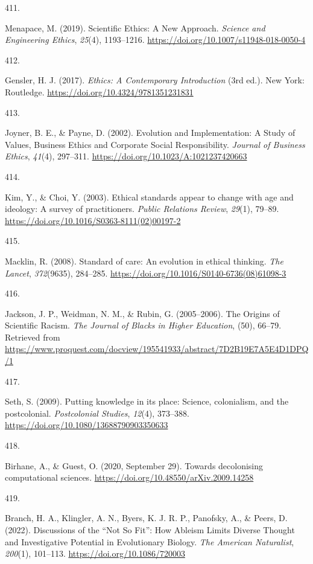 \documentclass[
  11pt,
  letterpaper,
]{scrreprt}
\newlength{\cslhangindent}
\newlength{\csllabelwidth}
\newenvironment{CSLReferences}[2] %
 {\begin{list}{}{%
  \setlength{\itemindent}{0pt}
  \setlength{\leftmargin}{0pt}
  \setlength{\parsep}{0pt}
  \ifodd #1
   \setlength{\leftmargin}{\cslhangindent}
   \setlength{\itemindent}{-1\cslhangindent}
  \fi
  \setlength{\itemsep}{#2\baselineskip}}}
 {\end{list}}
\newcommand{\CSLLeftMargin}[1]{\parbox[t]{\csllabelwidth}{\strut#1\strut}}
\newcommand{\CSLRightInline}[1]{\parbox[t]{\linewidth - \csllabelwidth}{\strut#1\strut}}
\begin{document}
\begin{CSLReferences}{0}{0}
\CSLLeftMargin{411. }%
\CSLRightInline{Menapace, M. (2019). Scientific {Ethics}: {A New
Approach}. \emph{Science and Engineering Ethics}, \emph{25}(4),
1193--1216. \url{https://doi.org/10.1007/s11948-018-0050-4}}

\CSLLeftMargin{412. }%
\CSLRightInline{Gensler, H. J. (2017). \emph{Ethics: {A Contemporary
Introduction}} (3rd ed.). New York: Routledge.
\url{https://doi.org/10.4324/9781351231831}}

\CSLLeftMargin{413. }%
\CSLRightInline{Joyner, B. E., \& Payne, D. (2002). Evolution and
{Implementation}: {A Study} of {Values}, {Business Ethics} and
{Corporate Social Responsibility}. \emph{Journal of Business Ethics},
\emph{41}(4), 297--311. \url{https://doi.org/10.1023/A:1021237420663}}

\CSLLeftMargin{414. }%
\CSLRightInline{Kim, Y., \& Choi, Y. (2003). Ethical standards appear to
change with age and ideology: A survey of practitioners. \emph{Public
Relations Review}, \emph{29}(1), 79--89.
\url{https://doi.org/10.1016/S0363-8111(02)00197-2}}

\CSLLeftMargin{415. }%
\CSLRightInline{Macklin, R. (2008). Standard of care: An evolution in
ethical thinking. \emph{The Lancet}, \emph{372}(9635), 284--285.
\url{https://doi.org/10.1016/S0140-6736(08)61098-3}}

\CSLLeftMargin{416. }%
\CSLRightInline{Jackson, J. P., Weidman, N. M., \& Rubin, G.
(2005--2006). The {Origins} of {Scientific Racism}. \emph{The Journal of
Blacks in Higher Education}, (50), 66--79. Retrieved from
\url{https://www.proquest.com/docview/195541933/abstract/7D2B19E7A5E4D1DPQ/1}}

\CSLLeftMargin{417. }%
\CSLRightInline{Seth, S. (2009). Putting knowledge in its place:
Science, colonialism, and the postcolonial. \emph{Postcolonial Studies},
\emph{12}(4), 373--388. \url{https://doi.org/10.1080/13688790903350633}}

\CSLLeftMargin{418. }%
\CSLRightInline{Birhane, A., \& Guest, O. (2020, September 29). Towards
decolonising computational sciences.
\url{https://doi.org/10.48550/arXiv.2009.14258}}

\CSLLeftMargin{419. }%
\CSLRightInline{Branch, H. A., Klingler, A. N., Byers, K. J. R. P.,
Panofsky, A., \& Peers, D. (2022). Discussions of the {``{Not So
Fit}''}: {How Ableism Limits Diverse Thought} and {Investigative
Potential} in {Evolutionary Biology}. \emph{The American Naturalist},
\emph{200}(1), 101--113. \url{https://doi.org/10.1086/720003}}


\end{CSLReferences}
\end{document}

